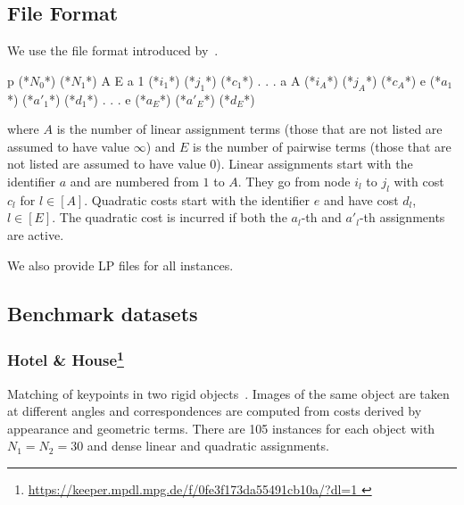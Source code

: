 \subsection{File Format}
\label{sec:graph-matching-file-format}

We use the file format introduced by~\cite{torresani2012dual}.

\begin{fileformat}
p (*$N_0$*) (*$N_1$*) A E 
a 1 (*$i_1$*) (*$j_1$*) (*$c_1$*)
.
.
.
a A (*$i_A$*) (*$j_A$*) (*$c_A$*)
e (*$a_1$*) (*$a'_1$*) (*$d_1$*)
.
.
.
e (*$a_E$*) (*$a'_E$*) (*$d_E$*)
\end{fileformat}
where $A$ is the number of linear assignment terms (those that are not listed are assumed to have value $\infty$) and $E$ is the number of pairwise terms (those that are not listed are assumed to have value $0$).
Linear assignments start with the identifier $a$ and are numbered from $1$ to $A$. They go from node $i_l$ to $j_l$ with cost $c_l$ for $l \in [A]$.
Quadratic costs start with the identifier $e$ and have cost $d_l$, $l \in [E]$.
The quadratic cost is incurred if both the $a_l$-th and $a'_l$-th assignments are active.

We also provide LP files for all instances.

\subsection{Benchmark datasets}

\subsubsection[Hotel \& House]{Hotel \& House\footnote{\url{https://keeper.mpdl.mpg.de/f/0fe3f173da55491cb10a/?dl=1
}}}
Matching of keypoints in two rigid objects~\cite{torresani2012dual}.
Images of the same object are taken at different angles and correspondences are computed from costs derived by appearance and geometric terms.
There are 105 instances for each object with $N_1 = N_2 = 30$ and dense linear and quadratic assignments.


